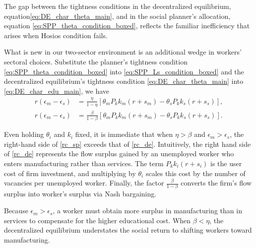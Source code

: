 \documentclass[12pt]{article} %
\theoremstyle{definition}
\begin{document}

The gap  between the tightness conditions in the decentralized equilibrium, equation\eqref{eq:DE_char_theta_main},  and in the social planner's allocation, equation \eqref{eq:SPP_theta_condition_boxed},  reflects the familiar inefficiency that arises when Hosios condition fails.

What is new in our two-sector environment is an additional wedge in workers' sectoral choices.  %
Substitute the planner's tightness condition \eqref{eq:SPP_theta_condition_boxed} into \eqref{eq:SPP_Ls_condition_boxed} and the decentralized equilibrium's tightness condition \eqref{eq:DE_char_theta_main} into \eqref{eq:DE_char_edu_main}, we have
\begin{align}
    r(\epsilon_m-\epsilon_s) &= \frac{\eta}{1-\eta}[\theta_mP_kk_m(r+s_m)-\theta_sP_kk_s(r+s_s)],   \label{rc_sp}\\
        r(\epsilon_m-\epsilon_s) &= \frac{\beta}{1-\beta}[\theta_mP_kk_m(r+s_m)-\theta_sP_kk_s(r+s_s)].  \label{rc_de} 
\end{align}

Even holding $\theta_i$ and $k_i$ fixed, it is immediate that  when $\eta>\beta$ and $\epsilon_m>\epsilon_s$,  the right-hand side of \eqref{rc_sp} exceeds that of \eqref{rc_de}. Intuitively, the right hand side of \eqref{rc_de}  represents the flow surplus gained by an unemployed worker who enters manufacturing rather than services.  The term $P_kk_i(r+s_i)$ is the user cost of firm investment, and multiplying  by  $\theta_i$ scales this cost by the number of vacancies per unemployed worker. Finally, the factor  $\frac{\beta}{1-\beta}$ converts the firm's flow surplus into worker's surplus via Nash bargaining. 


Because $\epsilon_m>\epsilon_s$, a worker must obtain more surplus in manufacturing than in services to compensate for the higher educational cost. When $\beta<\eta$, the decentralized equilibrium understates the social return to shifting workers toward manufacturing.
\end{document}

